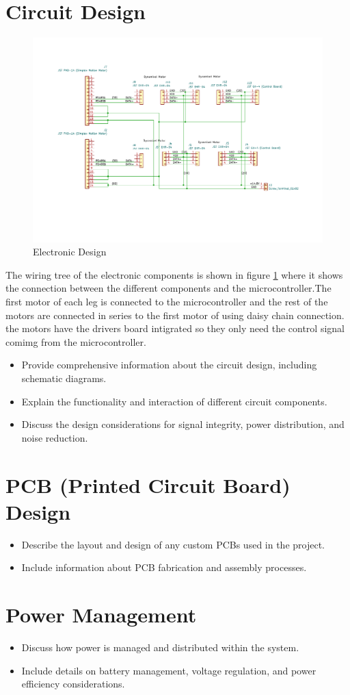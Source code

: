 \section{Circuit Design}
\begin{figure}[h]
	\centering
	\includegraphics[width=1\linewidth]{Legged_TWIPR_Wiring_Tree}
	\caption[ brakets for delectronic design second test ]{Electronic Design}
	\label{fig:electronicdesign}
\end{figure}
The wiring tree of the electronic components is shown in figure \ref{fig:electronicdesign} where it shows the connection between the different components and the microcontroller.The first motor of each leg is connected to the microcontroller and the rest of the motors are connected in series to the first motor of using daisy chain connection. the motors have the drivers board intigrated so they only need the control signal comimg from the microcontroller.
\begin{itemize}
	\item Provide comprehensive information about the circuit design, including schematic diagrams.
	\item Explain the functionality and interaction of different circuit components.
	\item Discuss the design considerations for signal integrity, power distribution, and noise reduction.
\end{itemize}
\section{PCB (Printed Circuit Board) Design}
\begin{itemize}
	\item Describe the layout and design of any custom PCBs used in the project.
	\item Include information about PCB fabrication and assembly processes.
\end{itemize}
\section{Power Management}
\begin{itemize}
	\item Discuss how power is managed and distributed within the system.
	\item Include details on battery management, voltage regulation, and power efficiency considerations.
\end{itemize}